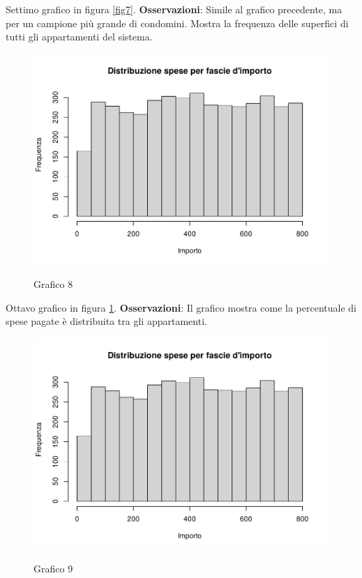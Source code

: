 Settimo grafico in figura \ref{fig7}. \textbf{Osservazioni}: Simile al grafico precedente, ma per un campione più grande di condomini. Mostra la frequenza delle superfici di tutti gli appartamenti del sistema.


\clearpage

\begin{figure}[t]
	\caption{Grafico 8}
	\includegraphics[page=8,width=\textwidth]{../R/grafici.pdf}
	\label{fig8}
\end{figure}

Ottavo grafico in figura \ref{fig8}. \textbf{Osservazioni}: Il grafico mostra come la percentuale di spese pagate è distribuita tra gli appartamenti.

\clearpage

\begin{figure}[t]
	\caption{Grafico 9}
	\includegraphics[page=9,width=\textwidth]{../R/grafici.pdf}
	\label{fig9}
\end{figure}


